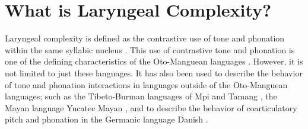 \section{What is Laryngeal Complexity?}\label{sec:what_is_lc}

Laryngeal complexity is defined as the contrastive use of tone and phonation within the same syllabic nucleus \citep{blankenshipTimeCourseBreathiness1997,blankenshipTimingNonmodalPhonation2002,silvermanLaryngealComplexityOtomanguean1997,silvermanPhasingRecoverability1997}. This use of contrastive tone and phonation is one of the defining characteristics of the Oto-Manguean languages \citep{silvermanLaryngealComplexityOtomanguean1997}. However, it is not limited to just these languages. It has also been used to describe the behavior of tone and phonation interactions in languages outside of the Oto-Manguean languages; such as the Tibeto-Burman languages of Mpi and Tamang \citep{silvermanLaryngealComplexityOtomanguean1997,silvermanPhasingRecoverability1997}, the Mayan language Yucatec Mayan \citep{frazierPhoneticsYucatecMaya2013}, and to describe the behavior of coarticulatory pitch and phonation in the Germanic language Danish \citep{frazierPhoneticsYucatecMaya2013,penaStodTimingDomain2022,penaProductionPerceptionStod2024}.


